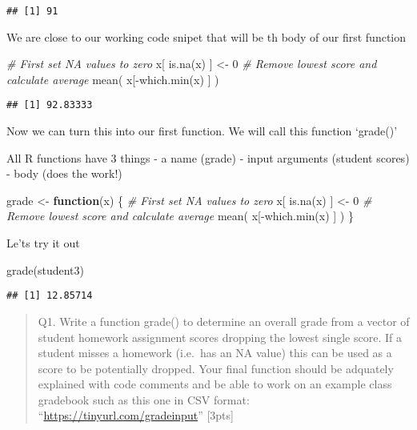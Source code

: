 \documentclass[
]{article}
\newenvironment{Shaded}{\begin{snugshade}}{\end{snugshade}}
\newcommand{\CommentTok}[1]{\textcolor[rgb]{0.56,0.35,0.01}{\textit{#1}}}
\newcommand{\ControlFlowTok}[1]{\textcolor[rgb]{0.13,0.29,0.53}{\textbf{#1}}}
\newcommand{\DecValTok}[1]{\textcolor[rgb]{0.00,0.00,0.81}{#1}}
\newcommand{\FunctionTok}[1]{\textcolor[rgb]{0.00,0.00,0.00}{#1}}
\newcommand{\NormalTok}[1]{#1}
\newcommand{\OtherTok}[1]{\textcolor[rgb]{0.56,0.35,0.01}{#1}}
\newcommand{\SpecialCharTok}[1]{\textcolor[rgb]{0.00,0.00,0.00}{#1}}
\begin{document}
\begin{verbatim}
## [1] 91
\end{verbatim}

We are close to our working code snipet that will be th body of our
first function

\begin{Shaded}
\begin{Highlighting}[]
\CommentTok{\# First set NA values to zero}
\NormalTok{x[ }\FunctionTok{is.na}\NormalTok{(x) ] }\OtherTok{\textless{}{-}} \DecValTok{0}
\CommentTok{\# Remove lowest score and calculate average}
\FunctionTok{mean}\NormalTok{( x[}\SpecialCharTok{{-}}\FunctionTok{which.min}\NormalTok{(x) ] )}
\end{Highlighting}
\end{Shaded}

\begin{verbatim}
## [1] 92.83333
\end{verbatim}

Now we can turn this into our first function. We will call this function
`grade()'

All R functions have 3 things - a name (grade) - input arguments
(student scores) - body (does the work!)

\begin{Shaded}
\begin{Highlighting}[]
\NormalTok{grade }\OtherTok{\textless{}{-}} \ControlFlowTok{function}\NormalTok{(x) \{}
  \CommentTok{\# First set NA values to zero}
\NormalTok{  x[ }\FunctionTok{is.na}\NormalTok{(x) ] }\OtherTok{\textless{}{-}} \DecValTok{0}
  \CommentTok{\# Remove lowest score and calculate average}
  \FunctionTok{mean}\NormalTok{( x[}\SpecialCharTok{{-}}\FunctionTok{which.min}\NormalTok{(x) ] )}
\NormalTok{\}}
\end{Highlighting}
\end{Shaded}

Le'ts try it out

\begin{Shaded}
\begin{Highlighting}[]
\FunctionTok{grade}\NormalTok{(student3)}
\end{Highlighting}
\end{Shaded}

\begin{verbatim}
## [1] 12.85714
\end{verbatim}

\begin{quote}
Q1. Write a function grade() to determine an overall grade from a vector
of student homework assignment scores dropping the lowest single score.
If a student misses a homework (i.e.~has an NA value) this can be used
as a score to be potentially dropped. Your final function should be
adquately explained with code comments and be able to work on an example
class gradebook such as this one in CSV format:
``\url{https://tinyurl.com/gradeinput}'' {[}3pts{]}
\end{quote}
\end{document}
